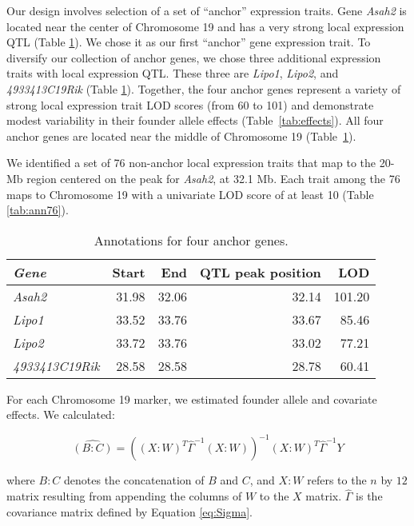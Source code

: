 \documentclass[oneside]{book}
\begin{document}
Our design involves selection of a set of ``anchor'' expression traits. Gene \emph{Asah2} is located near the center of Chromosome 19 and has a very strong local expression QTL (Table \ref{tab:ann4}). We chose it as our first ``anchor'' gene expression trait. To diversify our collection of anchor genes, we chose three additional expression traits with local expression QTL. These three are \emph{Lipo1}, \emph{Lipo2}, and \emph{4933413C19Rik} (Table \ref{tab:ann4}). Together, the four anchor genes represent a variety of strong local expression trait LOD scores (from 60 to 101) and demonstrate modest variability in their founder allele effects (Table~\ref{tab:effects}). All four anchor genes are located near the middle of Chromosome 19 (Table~\ref{tab:ann4}).




We identified a set of 76 non-anchor local expression traits that map to the 20-Mb region centered on the peak for \emph{Asah2}, at 32.1 Mb. Each trait among the 76 maps to Chromosome 19 with a univariate LOD score of at least 10 (Table \ref{tab:ann76}).


\begin{table}[ht]
\caption{Annotations for four anchor genes.}\label{tab:ann4}
\centering
\begin{tabular}{>{\em}lrrrr}
  \hline
Gene & Start & End & QTL peak position & LOD \\
  \hline
Asah2 & 31.98 & 32.06 & 32.14 & 101.20 \\
  Lipo1 & 33.52 & 33.76 & 33.67 & 85.46 \\
  Lipo2 & 33.72 & 33.76 & 33.02 & 77.21 \\
  4933413C19Rik & 28.58 & 28.58 & 28.78 & 60.41 \\
   \hline
\end{tabular}
\end{table}







For each Chromosome 19 marker, we estimated founder allele and covariate effects. We calculated:

\begin{equation}\label{eq:uni-Bhat}
\widehat {(B:C)} = \left((X:W)^T\hat\Gamma^{-1}(X:W)\right)^{-1}(X:W)^T\hat\Gamma^{-1}Y
\end{equation}

\noindent where $B:C$ denotes the concatenation of $B$ and $C$, and $X:W$ refers to the $n$ by $12$ matrix resulting from appending the columns of $W$ to the $X$ matrix. $\hat\Gamma$ is the covariance matrix defined by Equation \ref{eq:Sigma}.
\end{document}
